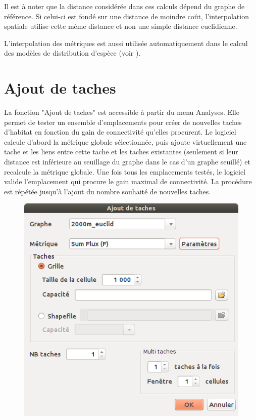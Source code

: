 \documentclass{article}
\begin{document}
Il est à noter que la distance considérée dans ces calculs dépend du graphe de référence. Si celui-ci est fondé sur une distance de moindre coût, l’interpolation spatiale utilise cette même distance et non une simple distance euclidienne.

L’interpolation des métriques est aussi utilisée automatiquement dans le calcul des modèles de distribution d’espèce (voir ).


\section{Ajout de taches}
La fonction "Ajout de taches" est accessible à partir du menu Analyses. Elle permet de tester un ensemble d’emplacements pour créer de nouvelles taches d’habitat en fonction du gain de connectivité qu’elles procurent. Le logiciel calcule d’abord la métrique globale sélectionnée, puis ajoute virtuellement une tache et les liens entre cette tache et les taches existantes (seulement si leur distance est inférieure au seuillage du graphe dans le cas d’un graphe seuillé) et recalcule la métrique globale. Une fois tous les emplacements testés, le logiciel valide l’emplacement qui procure le gain maximal de connectivité. La procédure est répétée jusqu’à l’ajout du nombre souhaité de nouvelles taches.

\begin{figure}[H]
	\includegraphics[scale=0.5]{img/manual-fr_addpatch.png} 
\end{figure}
\end{document}
